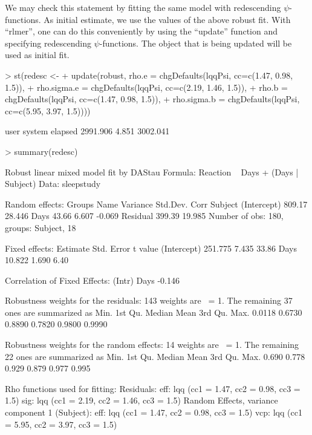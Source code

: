 \documentclass[11pt, a4paper]{article}
\renewenvironment{Schunk}{\vspace{\topsep}}{\vspace{\topsep}}
\theoremstyle{note}
\begin{document}
We may check this statement by fitting the same model with redescending
$\psi$-functions. As initial estimate, we use the values of the above
robust fit. With ``rlmer'', one can do this conveniently by using the
``update'' function and specifying redescending $\psi$-functions. The
object that is being updated will be used as initial fit.

\begin{Schunk}
\begin{Sinput}
> st(redesc <-
+    update(robust, rho.e = chgDefaults(lqqPsi, cc=c(1.47, 0.98, 1.5)),
+           rho.sigma.e = chgDefaults(lqqPsi, cc=c(2.19, 1.46, 1.5)),
+           rho.b = chgDefaults(lqqPsi, cc=c(1.47, 0.98, 1.5)),
+           rho.sigma.b = chgDefaults(lqqPsi, cc=c(5.95, 3.97, 1.5))))
\end{Sinput}
\begin{Soutput}
    user   system  elapsed 
2991.906    4.851 3002.041 
\end{Soutput}
\begin{Sinput}
> summary(redesc)
\end{Sinput}
\begin{Soutput}
Robust linear mixed model fit by DAStau 
Formula: Reaction ~ Days + (Days | Subject) 
   Data: sleepstudy 

Random effects:
 Groups   Name        Variance Std.Dev. Corr  
 Subject  (Intercept) 809.17   28.446         
          Days         43.66    6.607   -0.069
 Residual             399.39   19.985         
Number of obs: 180, groups: Subject, 18

Fixed effects:
            Estimate Std. Error t value
(Intercept)  251.775      7.435   33.86
Days          10.822      1.690    6.40

Correlation of Fixed Effects:
     (Intr)
Days -0.146

Robustness weights for the residuals: 
 143 weights are ~= 1. The remaining 37 ones are summarized as
   Min. 1st Qu.  Median    Mean 3rd Qu.    Max. 
 0.0118  0.6730  0.8890  0.7820  0.9800  0.9990 

Robustness weights for the random effects: 
 14 weights are ~= 1. The remaining 22 ones are summarized as
   Min. 1st Qu.  Median    Mean 3rd Qu.    Max. 
  0.690   0.778   0.929   0.879   0.977   0.995 

Rho functions used for fitting:
  Residuals:
    eff: lqq (cc1 = 1.47, cc2 = 0.98, cc3 = 1.5) 
    sig: lqq (cc1 = 2.19, cc2 = 1.46, cc3 = 1.5) 
  Random Effects, variance component 1 (Subject):
    eff: lqq (cc1 = 1.47, cc2 = 0.98, cc3 = 1.5) 
    vcp: lqq (cc1 = 5.95, cc2 = 3.97, cc3 = 1.5) 
\end{Soutput}
\end{Schunk}
\end{document}

